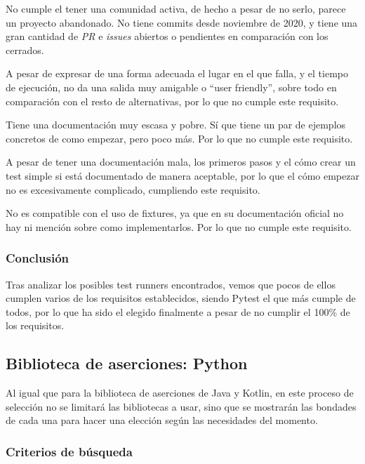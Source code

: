 \begin{todolist}
    \item  No cumple el tener una comunidad activa, de hecho a pesar de no
    serlo, parece un proyecto abandonado. No tiene commits desde noviembre de
    2020, y tiene una gran cantidad de \emph{PR} e \emph{issues} abiertos o
    pendientes en comparación con los cerrados.
    \item A pesar de expresar de una forma adecuada el lugar en el que falla, y
    el tiempo de ejecución, no da una salida muy amigable o ``user friendly'', sobre
    todo en comparación con el resto de alternativas, por lo que no cumple este
    requisito.
    \item Tiene una documentación muy escasa y pobre. Sí que tiene un par de
    ejemplos concretos de como empezar, pero poco más. Por lo que no cumple este
    requisito.
    \item[\xcmark] A pesar de tener una documentación mala, los primeros pasos y
    el cómo crear un test simple si está documentado de manera aceptable, por lo
    que el cómo empezar no es excesivamente complicado, cumpliendo este
    requisito. 
    \item No es compatible con el uso de fixtures, ya que en su documentación
    oficial no hay ni mención sobre como implementarlos. Por lo que no cumple
    este requisito.
\end{todolist}

\subsubsection{Conclusión}

Tras analizar los posibles test runners encontrados, vemos que pocos de ellos
cumplen varios de los requisitos establecidos, siendo Pytest el que más cumple
de todos, por lo que ha sido el elegido finalmente a pesar de no cumplir el
100\% de los requisitos.


\subsection{Biblioteca de aserciones: Python}

Al igual que para la biblioteca de aserciones de Java y Kotlin, en este proceso
de selección no se limitará las bibliotecas a usar, sino que se mostrarán las
bondades de cada una para hacer una elección según las necesidades del momento.


\subsubsection{Criterios de búsqueda}

